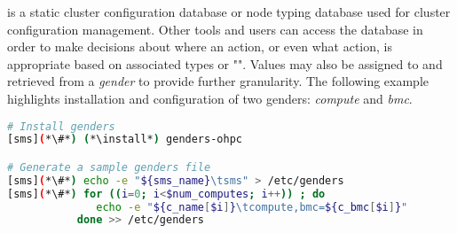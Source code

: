 \genders{} is a static cluster configuration database or node typing database
used for cluster configuration management. Other tools and users can access the
\genders{} database in order to make decisions about where an action, or even
what action, is appropriate based on associated types or "\genders{}".  Values
may also be assigned to and retrieved from a {\em gender} to provide further
granularity. The following example highlights installation and configuration of
two {genders}: {\em compute} and {\em bmc}.

\begin{lstlisting}[language=bash,keywords={},upquote=true]
# Install genders
[sms](*\#*) (*\install*) genders-ohpc

# Generate a sample genders file
[sms](*\#*) echo -e "${sms_name}\tsms" > /etc/genders
[sms](*\#*) for ((i=0; i<$num_computes; i++)) ; do
              echo -e "${c_name[$i]}\tcompute,bmc=${c_bmc[$i]}"
           done >> /etc/genders
\end{lstlisting}

